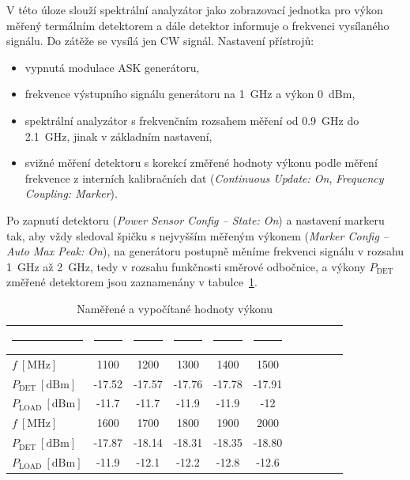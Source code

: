 \documentclass[11pt,a4paper]{article}
\begin{document}
V této úloze slouží spektrální analyzátor jako zobrazovací jednotka pro výkon měřený termálním detektorem a dále detektor informuje o frekvenci vysílaného signálu. Do zátěže se vysílá jen CW signál. Nastavení přístrojů:
\begin{itemize}
    \item vypnutá modulace ASK generátoru,
    \item frekvence výstupního signálu generátoru na 1~GHz a výkon 0~dBm,
    \item spektrální analyzátor s frekvenčním rozsahem měření od 0.9~GHz do 2.1~GHz, jinak v základním nastavení,
    \item svižné měření detektoru s korekcí změřené hodnoty výkonu podle měření frekvence z interních kalibračních dat (\emph{Continuous Update: On}, \emph{Frequency Coupling: Marker}).
\end{itemize}
Po zapnutí detektoru (\emph{Power Sensor Config -- State: On}) a nastavení markeru tak, aby vždy sledoval špičku s nejvyšším měřeným výkonem (\emph{Marker Config -- Auto Max Peak: On}), na generátoru postupně měníme frekvenci signálu v rozsahu 1~GHz až 2~GHz, tedy v rozsahu funkčnosti směrové odbočnice, a výkony $P_{\mathrm{DET}}$ změřené detektorem jsou zaznamenány v tabulce~\ref{table:task2-data}.
\begin{table}[!ht]
    \centering
    \begin{tabular}{|l||c|c|c|c|c|c|c|c|c|c|}
        \rule{2cm}{0pt} & \rule{1.5cm}{0pt} & \rule{1.5cm}{0pt} & \rule{1.5cm}{0pt} & \rule{1.5cm}{0pt} & \rule{1.5cm}{0pt}\\[-\arraystretch\normalbaselineskip]
        \hline
        $f\ [\mathrm{MHz}]$ & 1100 & 1200 & 1300 & 1400 & 1500\\
        \hline
        $P_{\mathrm{DET}} \ [\mathrm{dBm}]$ & -17.52 & -17.57 & -17.76 & -17.78 & -17.91\\
        \hline
        $P_{\mathrm{LOAD}} \ [\mathrm{dBm}]$ & -11.7 & -11.7 & -11.9 & -11.9 & -12\\
        \hline\hline
        $f\ [\mathrm{MHz}]$ & 1600 & 1700 & 1800 & 1900 & 2000\\
        \hline
        $P_{\mathrm{DET}} \ [\mathrm{dBm}]$ & -17.87 & -18.14 & -18.31 & -18.35 & -18.80\\
        \hline
        $P_{\mathrm{LOAD}} \ [\mathrm{dBm}]$ & -11.9 & -12.1 & -12.2 & -12.8 & -12.6\\
        \hline
    \end{tabular}
    \caption{\label{table:task2-data}Naměřené a vypočítané hodnoty výkonu}
\end{table}
\end{document}
